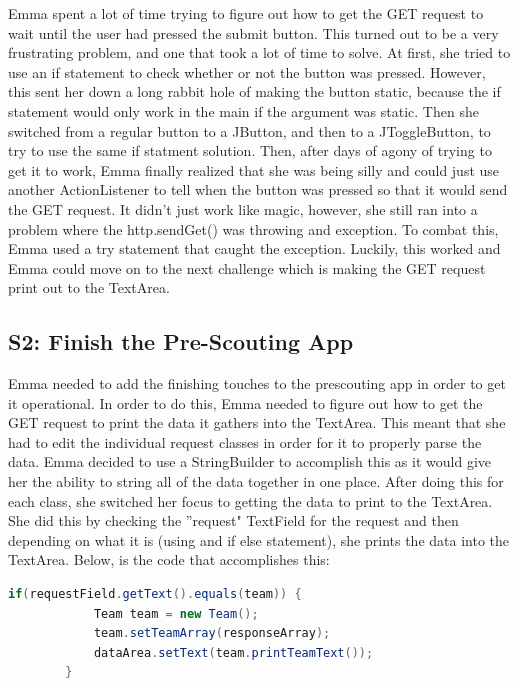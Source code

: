 \documentclass{article}
\begin{document}
Emma spent a lot of time trying to figure out how to get the GET request to wait until the user had pressed the submit button. This turned out to be a very frustrating problem, and one that took a lot of time to solve. At first, she tried to use an if statement to check whether or not the button was pressed. However, this sent her down a long rabbit hole of making the button static, because the if statement would only work in the main if the argument was static. Then she switched from a regular button to a JButton, and then to a JToggleButton, to try to use the same if statment solution. Then, after days of agony of trying to get it to work, Emma finally realized that she was being silly and could just use another ActionListener to tell when the button was pressed so that it would send the GET request. It didn't just work like magic, however, she still ran into a problem where the http.sendGet() was throwing and exception. To combat this, Emma used a try statement that caught the exception. Luckily, this worked and Emma could move on to the next challenge which is making the GET request print out to the TextArea.

\subsection{S2: Finish the Pre-Scouting App}

Emma needed to add the finishing touches to the prescouting app in order to get it operational. In order to do this, Emma needed to figure out how to get the GET request to print the data it gathers into the TextArea. This meant that she had to edit the individual request classes in order for it to properly parse the data. Emma decided to use a StringBuilder to accomplish this as it would give her the ability to string all of the data together in one place. After doing this for each class, she switched her focus to getting the data to print to the TextArea. She did this by checking the ''request" TextField for the request and then depending on what it is (using and if else statement), she prints the data into the TextArea. Below, is the code that accomplishes this: \\

\begin{lstlisting}[language=Java]
       if(requestField.getText().equals(team)) {
            Team team = new Team();
            team.setTeamArray(responseArray);
            dataArea.setText(team.printTeamText());
        } 
\end{lstlisting}
\end{document}
